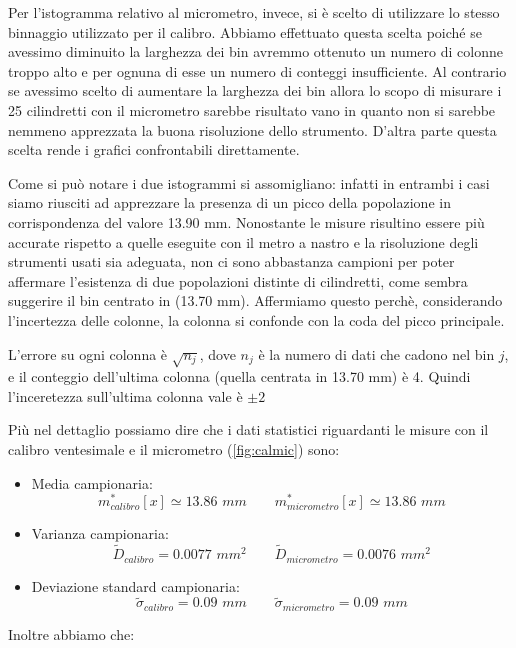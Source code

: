 Per l'istogramma relativo al micrometro, invece, si è scelto di utilizzare lo stesso
binnaggio utilizzato per il calibro. Abbiamo effettuato questa scelta poiché se avessimo
diminuito la larghezza dei bin avremmo ottenuto un numero di colonne troppo alto e per
ognuna di esse un numero di conteggi insufficiente. Al contrario se avessimo scelto
di aumentare la larghezza dei bin allora lo scopo di misurare i 25 cilindretti
con il micrometro sarebbe risultato vano in quanto non si sarebbe nemmeno apprezzata
la buona risoluzione dello strumento. D'altra parte questa scelta rende i grafici 
confrontabili direttamente.

Come si può notare i due istogrammi si assomigliano: infatti in entrambi i casi
siamo riusciti ad apprezzare la presenza di un picco della popolazione in
corrispondenza del valore 13.90 mm. Nonostante le misure risultino essere
più accurate rispetto a quelle eseguite con il metro a nastro e la risoluzione
degli strumenti usati sia adeguata, non ci sono abbastanza campioni per poter affermare
l'esistenza di due popolazioni distinte di cilindretti, come sembra suggerire il bin
centrato in (13.70 mm). Affermiamo questo perchè, considerando l'incertezza delle colonne,
la colonna si confonde con la coda del picco principale.

L'errore su ogni colonna è $\sqrt{n_j}$, dove $n_j$ è la numero di dati che cadono nel
bin $j$, e il conteggio dell'ultima colonna (quella centrata in 13.70 mm) è 4. Quindi
l'inceretezza sull'ultima colonna vale è $\pm 2$

Più nel dettaglio possiamo dire che i dati statistici riguardanti le misure con il calibro
ventesimale e il micrometro (\ref{fig:calmic}) sono:

\begin{itemize}
    \item{Media campionaria:}
        \begin{equation}
        m^*_{calibro}[x] \simeq 13.86\,\,mm \qquad
        m^*_{micrometro}[x] \simeq 13.86\,\,mm 
        \end{equation}

    \item{Varianza campionaria:}
        \begin{equation}
        \tilde{D}_{calibro} = 0.0077\,\,mm^2 \qquad
        \tilde{D}_{micrometro} = 0.0076\,\,mm^2
        \end{equation}

    \item{Deviazione standard campionaria:}
        \begin{equation}
        \tilde{\sigma}_{calibro} = 0.09\,\,mm \qquad
        \tilde{\sigma}_{micrometro} = 0.09\,\,mm
        \end{equation}
\end{itemize}
Inoltre abbiamo che:

